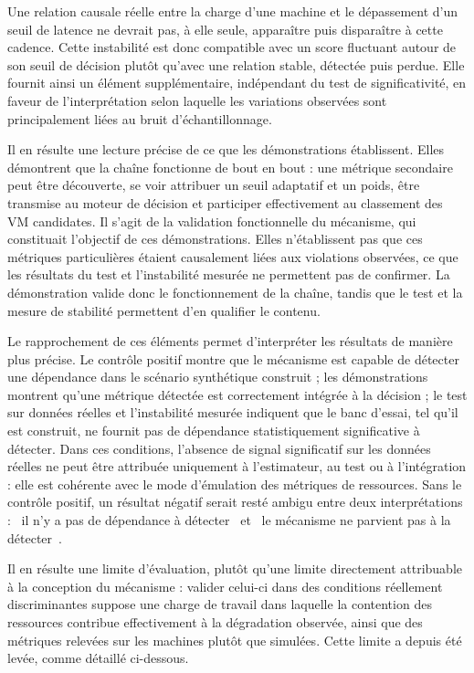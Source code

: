 Une relation causale réelle entre la charge d'une machine et le dépassement d'un seuil de latence ne devrait pas, à elle seule, apparaître puis disparaître à cette cadence. Cette instabilité est donc compatible avec un score fluctuant autour de son seuil de décision plutôt qu'avec une relation stable, détectée puis perdue. Elle fournit ainsi un élément supplémentaire, indépendant du test de significativité, en faveur de l'interprétation selon laquelle les variations observées sont principalement liées au bruit d'échantillonnage.

Il en résulte une lecture précise de ce que les démonstrations établissent. Elles démontrent que la chaîne fonctionne de bout en bout : une métrique secondaire peut être découverte, se voir attribuer un seuil adaptatif et un poids, être transmise au moteur de décision et participer effectivement au classement des VM candidates. Il s'agit de la validation fonctionnelle du mécanisme, qui constituait l'objectif de ces démonstrations. Elles n'établissent pas que ces métriques particulières étaient causalement liées aux violations observées, ce que les résultats du test et l'instabilité mesurée ne permettent pas de confirmer. La démonstration valide donc le fonctionnement de la chaîne, tandis que le test et la mesure de stabilité permettent d'en qualifier le contenu.

Le rapprochement de ces éléments permet d'interpréter les résultats de manière plus précise. Le contrôle positif montre que le mécanisme est capable de détecter une dépendance dans le scénario synthétique construit ; les démonstrations montrent qu'une métrique détectée est correctement intégrée à la décision ; le test sur données réelles et l'instabilité mesurée indiquent que le banc d'essai, tel qu'il est construit, ne fournit pas de dépendance statistiquement significative à détecter. Dans ces conditions, l'absence de signal significatif sur les données réelles ne peut être attribuée uniquement à l'estimateur, au test ou à l'intégration : elle est cohérente avec le mode d'émulation des métriques de ressources. Sans le contrôle positif, un résultat négatif serait resté ambigu entre deux interprétations : \og~il n'y a pas de dépendance à détecter~\fg{} et \og~le mécanisme ne parvient pas à la détecter~\fg{}.

Il en résulte une limite d'évaluation, plutôt qu'une limite directement attribuable à la conception du mécanisme : valider celui-ci dans des conditions réellement discriminantes suppose une charge de travail dans laquelle la contention des ressources contribue effectivement à la dégradation observée, ainsi que des métriques relevées sur les machines plutôt que simulées. Cette limite a depuis été levée, comme détaillé ci-dessous.

